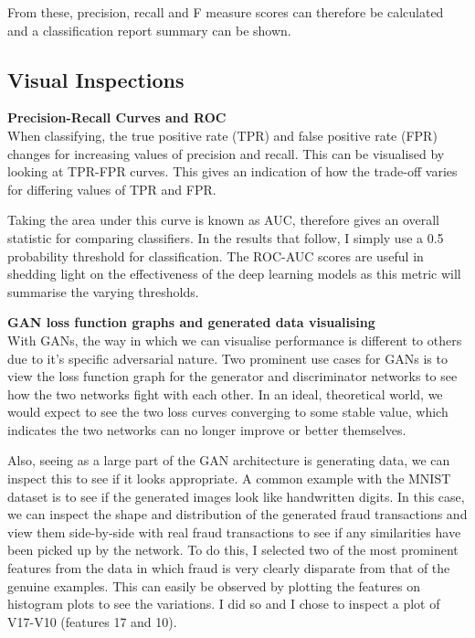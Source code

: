 \documentclass[12pt,a4paper,twoside]{report}
\begin{document}
From these, precision, recall and F measure scores can therefore be calculated and a classification report summary can be shown. 

\subsection{Visual Inspections}

\textbf{Precision-Recall Curves and ROC}\\
When classifying, the true positive rate (TPR) and false positive rate (FPR) changes for increasing values of precision and recall. This can be visualised by looking at TPR-FPR curves. This gives an indication of how the trade-off varies for differing values of TPR and FPR.

Taking the area under this curve is known as AUC, therefore gives an overall statistic for comparing classifiers. In the results that follow, I simply use a 0.5 probability threshold for classification. The ROC-AUC scores are useful in shedding light on the effectiveness of the deep learning models as this metric will summarise the varying thresholds.

\textbf{GAN loss function graphs and generated data visualising}\\
With GANs, the way in which we can visualise performance is different to others due to it's specific adversarial nature. Two prominent use cases for GANs is to view the loss function graph for the generator and discriminator networks to see how the two networks fight with each other. In an ideal, theoretical world, we would expect to see the two loss curves converging to some stable value, which indicates the two networks can no longer improve or better themselves. 

Also, seeing as a large part of the GAN architecture is generating data, we can inspect this to see if it looks appropriate. A common example with the MNIST dataset is to see if the generated images look like handwritten digits. In this case, we can inspect the shape and distribution of the generated fraud transactions and view them side-by-side with real fraud transactions to see if any similarities have been picked up by the network. To do this, I selected two of the most prominent features from the data in which fraud is very clearly disparate from that of the genuine examples. This can easily be observed by plotting the features on histogram plots to see the variations. I did so and I chose to inspect a plot of V17-V10 (features 17 and 10).
\end{document}
